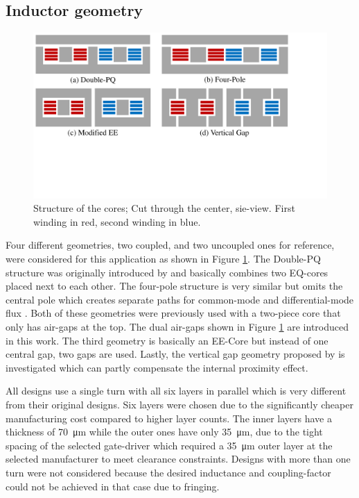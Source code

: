 \documentclass{IPEC2026}
\begin{document}
\subsection{Inductor geometry}
\begin{figure}
  \includegraphics[page=1, trim = 0cm 7cm 4.5cm 0cm, clip, width=\columnwidth]{figures/IPEC_Figures_PowerPoint.pdf}
  \caption{Structure of the cores; Cut through the center, sie-view. First winding in red, second winding in blue.}
  \label{fig:Core_Drawings}
\end{figure}
Four different geometries, two coupled, and two uncoupled ones for reference, were considered for this application as shown in Figure \ref{fig:Core_Drawings}. The Double-PQ structure was originally introduced by \cite{wangPCBWindingBasedCoupled2023} and basically combines two EQ-cores placed next to each other. The four-pole structure is very similar but omits the central pole which creates separate paths for common-mode and differential-mode flux \cite{huaUltrathinCoupledInductor2021}. Both of these geometries were previously used with a two-piece core that only has air-gaps at the top. The dual air-gaps shown in Figure \ref{fig:Core_Drawings} are introduced in this work. The third geometry is basically an EE-Core but instead of one central gap, two gaps are used. Lastly, the vertical gap geometry proposed by \cite{schaferNovelHighlyEfficient2020} is investigated which can partly compensate the internal proximity effect. %
\par All designs use a single turn with all six layers in parallel which is very different from their original designs. Six layers were chosen due to the significantly cheaper manufacturing cost compared to higher layer counts. The inner layers have a thickness of \qty{70}{\um} while the outer ones have only \qty{35}{\um}, due to the tight spacing of the selected gate-driver which required a \qty{35}{\um} outer layer at the selected manufacturer to meet clearance constraints. Designs with more than one turn were not considered because the desired inductance and coupling-factor could not be achieved in that case due to fringing.
\end{document}
